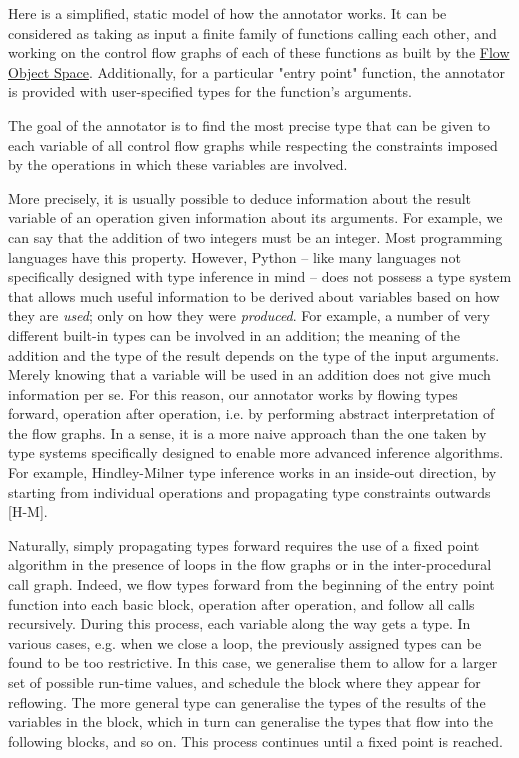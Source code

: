 \documentclass{acm_proc_article-sp}
\begin{document}
Here is a simplified, static model of how the annotator works.  It can
be considered as taking as input a finite family of functions calling
each other, and working on the control flow graphs of each of these
functions as built by the \href{flowobjspace}{Flow Object Space}.
Additionally, for a particular "entry point" function, the annotator
is provided with user-specified types for the function's arguments.

The goal of the annotator is to find the most precise type that can be
given to each variable of all control flow graphs while respecting the
constraints imposed by the operations in which these variables are
involved.

More precisely, it is usually possible to deduce information about the
result variable of an operation given information about its arguments.
For example, we can say that the addition of two integers must be an
integer.  Most programming languages have this property.  However,
Python -- like many languages not specifically designed with type
inference in mind -- does not possess a type system that allows much
useful information to be derived about variables based on how they are
\textit{used}; only on how they were \textit{produced}.  For example, a number of very
different built-in types can be involved in an addition; the meaning of
the addition and the type of the result depends on the type of the input
arguments.  Merely knowing that a variable will be used in an addition
does not give much information per se.  For this reason, our annotator
works by flowing types forward, operation after operation, i.e. by
performing abstract interpretation of the flow graphs.  In a sense, it
is a more naive approach than the one taken by type systems specifically
designed to enable more advanced inference algorithms.  For example,
Hindley-Milner type inference works in an inside-out direction, by
starting from individual operations and propagating type constraints
outwards [H-M].

Naturally, simply propagating types forward requires the use of a fixed
point algorithm in the presence of loops in the flow graphs or in the
inter-procedural call graph.  Indeed, we flow types forward from the
beginning of the entry point function into each basic block, operation
after operation, and follow all calls recursively.  During this process,
each variable along the way gets a type.  In various cases, e.g. when we
close a loop, the previously assigned types can be found to be too
restrictive.  In this case, we generalise them to allow for a larger set
of possible run-time values, and schedule the block where they appear
for reflowing.  The more general type can generalise the types of the
results of the variables in the block, which in turn can generalise the
types that flow into the following blocks, and so on.  This process
continues until a fixed point is reached.
\end{document}
